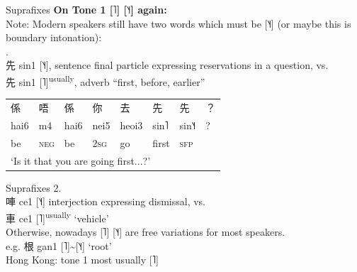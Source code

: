 \documentclass{beamer}
\begin{document}
\begin{frame}[fragile]{Suprafixes}
\textbf{On Tone 1 [˥] [˥˧] again:}\\
\medskip
Note: Modern speakers still have two words which must be [˥˧] (or maybe this is boundary intonation):\\
.\\
先 sin1 [˥˧], sentence final particle expressing reservations in a question, vs.\\
先 sin1 [˥]\textsuperscript{usually}, adverb \enquote{first, before, earlier}\\
\medskip
\begin{table}
    \raggedright
    \begin{tabular}{l l l l l l l l}
        係& 唔& 係& 你& 去& 先& 先& ？\\
        hai6& m4& hai6& nei5& heoi3& sin˥& sin˥˧& ?\\
        be& \textsc{neg}& be& \textsc{2sg}& go& first& \textsc{sfp}& \\
        \multicolumn{8}{l}{\enquote*{Is it that you are going first...?}}
    \end{tabular}
\end{table}

\end{frame}

\begin{frame}[fragile]{Suprafixes}
2.\\
唓 ce1 [˥˧] interjection expressing dismissal, vs.\\
車 ce1 [˥]\textsuperscript{usually} \enquote*{vehicle}\\
\bigskip
Otherwise, nowadays [˥] [˥˧] are free variations for most speakers.\\
e.g. 根 gan1 [˥]\~{}[˥˧] \enquote*{root}\\
Hong Kong: tone 1 most usually [˥]\\
\medskip
\end{frame}
\end{document}
